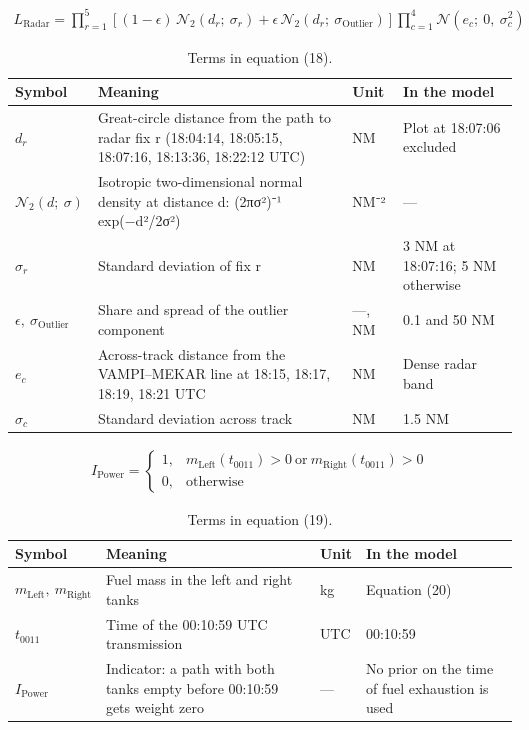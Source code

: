 \begin{multline}
L_{\mathrm{Radar}} = \prod_{r=1}^{5} \left[ (1-\epsilon)\, \mathcal{N}_{2}\left(d_{r};\ \sigma_{r}\right) + \epsilon\, \mathcal{N}_{2}\left(d_{r};\ \sigma_{\mathrm{Outlier}}\right) \right] \prod_{c=1}^{4} \mathcal{N}\left(e_{c};\ 0,\ \sigma_{c}^{2}\right)
\label{eq:18}
\end{multline}
\begin{table}[h]
\caption{Terms in equation (18).}
\small
\begin{tabular}{p{2.4cm}p{4.6cm}p{1.1cm}p{4.0cm}}
\hline
Symbol & Meaning & Unit & In the model \\
\hline
$d_{r}$ & Great-circle distance from the path to radar fix r (18:04:14, 18:05:15, 18:07:16, 18:13:36, 18:22:12 UTC) & NM & Plot at 18:07:06 excluded \\
$\mathcal{N}_{2}(d;\ \sigma)$ & Isotropic two-dimensional normal density at distance d: (2πσ²)⁻¹ exp(−d²/2σ²) & NM⁻² & — \\
$\sigma_{r}$ & Standard deviation of fix r & NM & 3 NM at 18:07:16; 5 NM otherwise \\
$\epsilon,\ \sigma_{\mathrm{Outlier}}$ & Share and spread of the outlier component & —, NM & 0.1 and 50 NM \\
$e_{c}$ & Across-track distance from the VAMPI–MEKAR line at 18:15, 18:17, 18:19, 18:21 UTC & NM & Dense radar band \\
$\sigma_{c}$ & Standard deviation across track & NM & 1.5 NM \\
\hline
\end{tabular}
\end{table}

\begin{multline}
I_{\mathrm{Power}} = \begin{cases} 1, & m_{\mathrm{Left}}\left(t_{0011}\right) > 0 \ \text{or}\ m_{\mathrm{Right}}\left(t_{0011}\right) > 0 \\ 0, & \text{otherwise} \end{cases}
\label{eq:19}
\end{multline}
\begin{table}[h]
\caption{Terms in equation (19).}
\small
\begin{tabular}{p{2.4cm}p{4.6cm}p{1.1cm}p{4.0cm}}
\hline
Symbol & Meaning & Unit & In the model \\
\hline
$m_{\mathrm{Left}},\ m_{\mathrm{Right}}$ & Fuel mass in the left and right tanks & kg & Equation (20) \\
$t_{0011}$ & Time of the 00:10:59 UTC transmission & UTC & 00:10:59 \\
$I_{\mathrm{Power}}$ & Indicator: a path with both tanks empty before 00:10:59 gets weight zero & — & No prior on the time of fuel exhaustion is used \\
\hline
\end{tabular}
\end{table}

